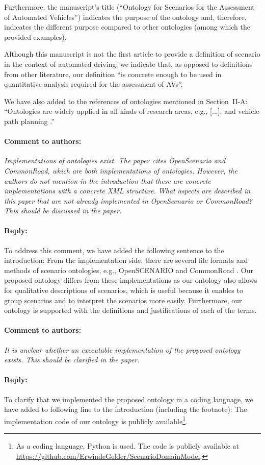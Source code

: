 \documentclass[10pt,final,a4paper,oneside,onecolumn]{article}
\newcommand{\toauthor}{\paragraph*{Comment to authors:} \itshape}
\newcommand{\fromauthor}{\paragraph*{Reply:} \normalfont}
\newcommand{\cstart}{\cbstart\color{red}}
\newcommand{\cend}{\cbend\color{black}}
\begin{document}
Furthermore, the manuscript's title (``Ontology for Scenarios for the Assessment of Automated Vehicles'') indicates the purpose of the ontology and, therefore, indicates the different purpose compared to other ontologies (among which the provided examples).

Although this manuscript is not the first article to provide a definition of scenario in the context of automated driving, we indicate that, as opposed to definitions from other literature, our definition ``is concrete enough to be used in quantitative analysis required for the assessment of AVs''.

We have also added \textcite{provine2004ontology, schlenoff2003using} to the references of ontologies mentioned in Section~II-A: ``Ontologies are widely applied in all kinds of research areas, e.g., [...], \cstart and vehicle path planning \autocite{provine2004ontology, schlenoff2003using}.\cend''



\toauthor Implementations of ontologies exist. The paper cites OpenScenario and CommonRoad, which are both implementations of ontologies. However, the authors do not mention in the introduction that these are concrete implementations with a concrete XML structure. What aspects are described in this paper that are not already implemented in OpenScenario or CommonRoad? This should be discussed in the paper. 

\fromauthor To address this comment, we have added the following sentence to the introduction: \cstart From the implementation side, there are several file formats and methods of scenario ontologies, e.g., OpenSCENARIO \autocite{openscenario} and CommonRoad \autocite{althoff2017CommonRoad}. Our proposed ontology differs from these implementations as our ontology also allows for qualitative descriptions of scenarios, which is useful because it enables to group scenarios and to interpret the scenarios more easily.
Furthermore, our ontology is supported with the definitions and justifications of each of the terms.\cend



\toauthor It is unclear whether an executable implementation of the proposed ontology exists. This should be clarified in the paper.

\fromauthor To clarify that we implemented the proposed ontology in a coding language, we have added to following line to the introduction (including the footnote): \cstart The implementation code of our ontology is publicly available\footnote{\cstart As a coding language, Python is used. The code is publicly available at \url{https://github.com/ErwindeGelder/ScenarioDomainModel}.\cend}\cend.
\end{document}
